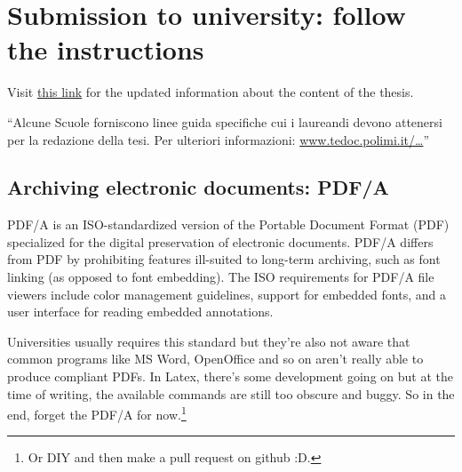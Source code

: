 \section{Submission to university: follow the instructions}
Visit \href{http://www.tedoc.polimi.it/tesilaurea/Consegna-tesi-di-laurea-(vecchio-ordinamento-e-specialistica)}{this link} for the updated information about the content of the thesis.

\enquote{Alcune Scuole forniscono linee guida specifiche cui i laureandi devono attenersi per la redazione della tesi. Per ulteriori informazioni:
\href{http://www.tedoc.polimi.it/download/lauree_magistrali/201406_POLITesi_Info_specifiche_scuole.pdf}{www.tedoc.polimi.it/\ldots}}

\subsection{Archiving electronic documents: PDF/A}
PDF/A is an ISO-standardized version of the Portable Document Format (PDF) specialized for the digital preservation of electronic documents. PDF/A differs from PDF by prohibiting features ill-suited to long-term archiving, such as font linking (as opposed to font embedding). The ISO requirements for PDF/A file viewers include color management guidelines, support for embedded fonts, and a user interface for reading embedded annotations.

Universities usually requires this standard but they're also not aware that common programs like MS Word, OpenOffice and so on aren't really able to produce compliant PDFs. In Latex, there's some development going on but at the time of writing, the available commands are still too obscure and buggy. So in the end, forget the PDF/A for now.\footnote{Or DIY and then make a pull request on github :D.}
